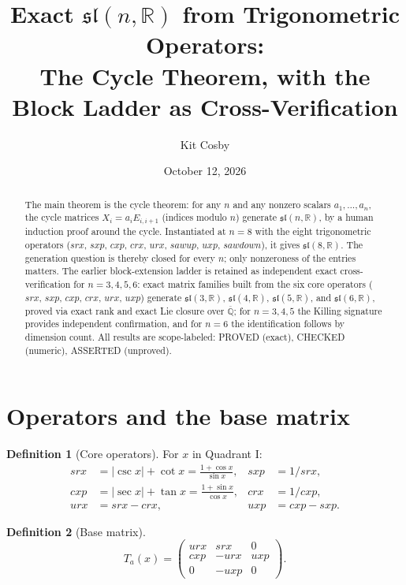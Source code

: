 \documentclass[11pt]{article}
\title{Exact $\mathfrak{sl}(n,\mathbb{R})$ from Trigonometric Operators:\\
The Cycle Theorem, with the Block Ladder as Cross-Verification}
\author{Kit Cosby}
\date{October 12, 2026}
\theoremstyle{definition}
\newtheorem{definition}{Definition}
\begin{document}
\maketitle

\begin{abstract}
The main theorem is the cycle theorem: for any $n$ and any nonzero scalars $a_1,\dots,a_n$, the cycle matrices $X_i = a_i E_{i,i+1}$ (indices modulo $n$) generate $\mathfrak{sl}(n,\mathbb{R})$, by a human induction proof around the cycle. Instantiated at $n=8$ with the eight trigonometric operators ($srx$, $sxp$, $cxp$, $crx$, $urx$, $sawup$, $uxp$, $sawdown$), it gives $\mathfrak{sl}(8,\mathbb{R})$. The generation question is thereby closed for every $n$; only nonzeroness of the entries matters. The earlier block-extension ladder is retained as independent exact cross-verification for $n=3,4,5,6$: exact matrix families built from the six core operators ($srx$, $sxp$, $cxp$, $crx$, $urx$, $uxp$) generate $\mathfrak{sl}(3,\mathbb{R})$, $\mathfrak{sl}(4,\mathbb{R})$, $\mathfrak{sl}(5,\mathbb{R})$, and $\mathfrak{sl}(6,\mathbb{R})$, proved via exact rank and exact Lie closure over $\overline{\mathbb{Q}}$; for $n=3,4,5$ the Killing signature provides independent confirmation, and for $n=6$ the identification follows by dimension count. All results are scope-labeled: PROVED (exact), CHECKED (numeric), ASSERTED (unproved).
\end{abstract}

\section{Operators and the base matrix}

\begin{definition}[Core operators]
For $x$ in Quadrant I:
\begin{align*}
srx &= |\csc x| + \cot x = \frac{1+\cos x}{\sin x}, &
sxp &= 1/srx, \\
cxp &= |\sec x| + \tan x = \frac{1+\sin x}{\cos x}, &
crx &= 1/cxp, \\
urx &= srx - crx, &
uxp &= cxp - sxp.
\end{align*}
\end{definition}

\begin{definition}[Base matrix]
\[
T_a(x) =
\begin{pmatrix}
urx & srx & 0 \\
cxp & -urx & uxp \\
0 & -uxp & 0
\end{pmatrix}.
\]
\end{definition}
\end{document}
